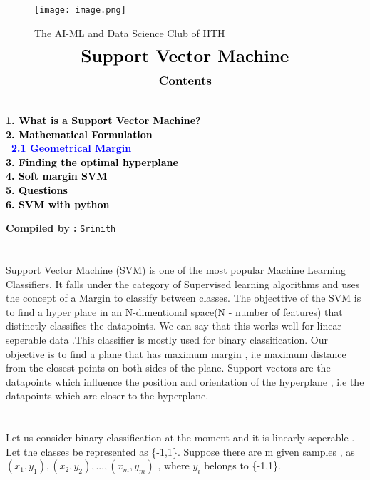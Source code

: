 \documentclass[12pt,a4paper]{article}
\begin{document}
\begin{center}
\begin{figure}[h]
\centering
\texttt{[image: image.png]}
\caption{{{\selectfont The AI-ML and Data Science Club of IITH}}}
\end{figure}
\end{center}
\begin{align*}
{\LARGE{\textbf{Support Vector Machine}}}
\end{align*}
\graphicspath{{./media/}}
\begin{align*}
\large{\textbf{{Contents}}}
\end{align*}
{\textcolor{black}{\textbf{
 \\
 1. {What is a Support Vector Machine?}\\
 2. {Mathematical Formulation }\\
\indent \    \textcolor{blue}{2.1 Geometrical Margin}\\
 3. {Finding the optimal hyperplane}\\
 4. {Soft margin SVM}\\
 5. {Questions}\\
6. {SVM with python}\\
}}
\begin{center}
    {\textbf{Compiled by :}
    \texttt{Srinith}}
\end{center}

\newpage
\section{}
Support Vector Machine (SVM) is one of the most popular Machine
Learning Classifiers. It falls under the category of Supervised learning
algorithms and uses the concept of a Margin to classify between classes. The objecttive of the SVM is to find a hyper place in an N-dimentional space(N - number of features) that distinctly classifies the datapoints. We can say that this works well for linear seperable data .This classifier is mostly used for binary classification. Our objective is to find a plane that has maximum margin , i.e maximum distance from the closest points on both sides of the plane. Support vectors are the datapoints which influence the position and orientation of the hyperplane , i.e the datapoints which are closer to the hyperplane.


\section{}
Let us consider binary-classification at the moment and it is linearly seperable . Let the classes be represented as \{-1,1\}. Suppose there are m given samples , as $(x_1,y_1),(x_2,y_2),...,(x_m,y_m)$ , where $y_i$ belongs to \{-1,1\}. 

}
\end{document}
